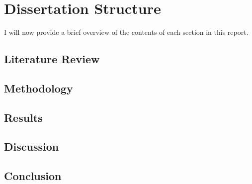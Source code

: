 \section{Dissertation Structure}
I will now provide a brief overview of the contents of each section in this report. 
\subsection{Literature Review}
\subsection{Methodology}
\subsection{Results}
\subsection{Discussion}
\subsection{Conclusion}